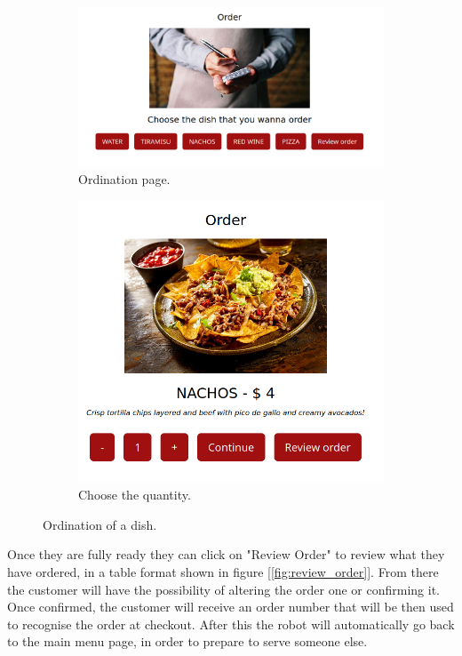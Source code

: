 \documentclass[12pt, letterpaper, twoside]{article}
\begin{document}
\

\begin{figure}[h]
	\centering
	\begin{subfigure}{.5\textwidth}
	  \centering
	  \includegraphics[width=1\linewidth]{img/order.png}
	  \caption{Ordination page.}
	  \label{fig:order}
	\end{subfigure}%
	\begin{subfigure}{.5\textwidth}
	  \centering
	  \includegraphics[width=.6\linewidth]{img/order_quantity.png}
	  \caption{Choose the quantity.}
	  \label{fig:order_quantity}
	\end{subfigure}
	\caption{Ordination of a dish.}
	\label{fig:ordination}
\end{figure}

Once they are fully ready they can click on "Review Order" to review what they have ordered, in a table format shown in figure [\ref{fig:review_order}]. From there the customer will have the possibility of altering the order one or confirming it. Once confirmed, the customer will receive an order number that will be then used to recognise the order at checkout. After this the robot will automatically go back to the main menu page, in order to prepare to serve someone else.
\end{document}
